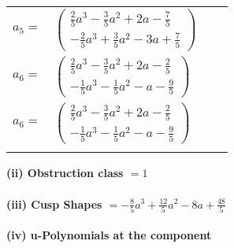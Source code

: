 \documentclass[1p]{elsarticle_modified}
\theoremstyle{definition}
\begin{document}
\begin{tabular}{m{7pt} m{180pt} m{7pt} m{180pt} }
\flushright $a_{5}=$&$\begin{pmatrix}\frac{2}{5} a^3-\frac{3}{5} a^2+2 a-\frac{7}{5}\\-\frac{2}{5} a^3+\frac{3}{5} a^2-3 a+\frac{7}{5}\end{pmatrix}$ \\
\flushright $a_{6}=$&$\begin{pmatrix}\frac{2}{5} a^3-\frac{3}{5} a^2+2 a-\frac{2}{5}\\-\frac{1}{5} a^3-\frac{1}{5} a^2- a-\frac{9}{5}\end{pmatrix}$\\ \flushright $a_{6}=$&$\begin{pmatrix}\frac{2}{5} a^3-\frac{3}{5} a^2+2 a-\frac{2}{5}\\-\frac{1}{5} a^3-\frac{1}{5} a^2- a-\frac{9}{5}\end{pmatrix}$\\&\end{tabular}
\flushleft \textbf{(ii) Obstruction class $= 1$}\\~\\
\flushleft \textbf{(iii) Cusp Shapes $= -\frac{8}{5} a^3+\frac{12}{5} a^2-8 a+\frac{48}{5}$}\\~\\
\newpage\renewcommand{\arraystretch}{1}
\flushleft \textbf{(iv) u-Polynomials at the component}\newline \\
\end{document}
